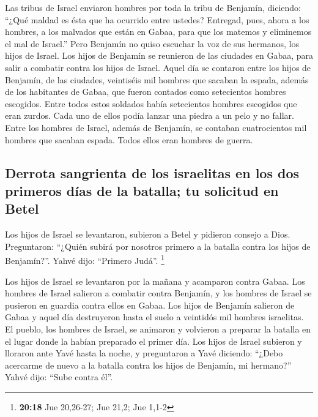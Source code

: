 \begin{paracol}{2}
 Las tribus de Israel enviaron hombres por toda la tribu
de Benjamín, diciendo: ``¿Qué maldad es ésta que ha ocurrido entre
ustedes?  Entregad, pues, ahora a los hombres, a los
malvados que están en Gabaa, para que los matemos y eliminemos el mal de
Israel.'' Pero Benjamín no quiso escuchar la voz de sus hermanos, los
hijos de Israel.  Los hijos de Benjamín se reunieron de
las ciudades en Gabaa, para salir a combatir contra los hijos de Israel.
 Aquel día se contaron entre los hijos de Benjamín, de
las ciudades, veintiséis mil hombres que sacaban la espada, además de
los habitantes de Gabaa, que fueron contados como setecientos hombres
escogidos.  Entre todos estos soldados había setecientos
hombres escogidos que eran zurdos. Cada uno de ellos podía lanzar una
piedra a un pelo y no fallar.  Entre los hombres de
Israel, además de Benjamín, se contaban cuatrocientos mil hombres que
sacaban espada. Todos ellos eran hombres de guerra.

\hypertarget{derrota-sangrienta-de-los-israelitas-en-los-dos-primeros-duxedas-de-la-batalla-tu-solicitud-en-betel}{%
\subsection{Derrota sangrienta de los israelitas en los dos primeros
días de la batalla; tu solicitud en
Betel}\label{derrota-sangrienta-de-los-israelitas-en-los-dos-primeros-duxedas-de-la-batalla-tu-solicitud-en-betel}}

 Los hijos de Israel se levantaron, subieron a Betel y
pidieron consejo a Dios. Preguntaron: ``¿Quién subirá por nosotros
primero a la batalla contra los hijos de Benjamín?''. Yahvé dijo:
``Primero Judá''. \footnote{\textbf{20:18} Jue 20,26-27; Jue 21,2; Jue
  1,1-2}

 Los hijos de Israel se levantaron por la mañana y
acamparon contra Gabaa.  Los hombres de Israel salieron a
combatir contra Benjamín, y los hombres de Israel se pusieron en guardia
contra ellos en Gabaa.  Los hijos de Benjamín salieron de
Gabaa y aquel día destruyeron hasta el suelo a veintidós mil hombres
israelitas.  El pueblo, los hombres de Israel, se
animaron y volvieron a preparar la batalla en el lugar donde la habían
preparado el primer día.  Los hijos de Israel subieron y
lloraron ante Yavé hasta la noche, y preguntaron a Yavé diciendo:
``¿Debo acercarme de nuevo a la batalla contra los hijos de Benjamín, mi
hermano?'' Yahvé dijo: ``Sube contra él''.


\end{paracol}

